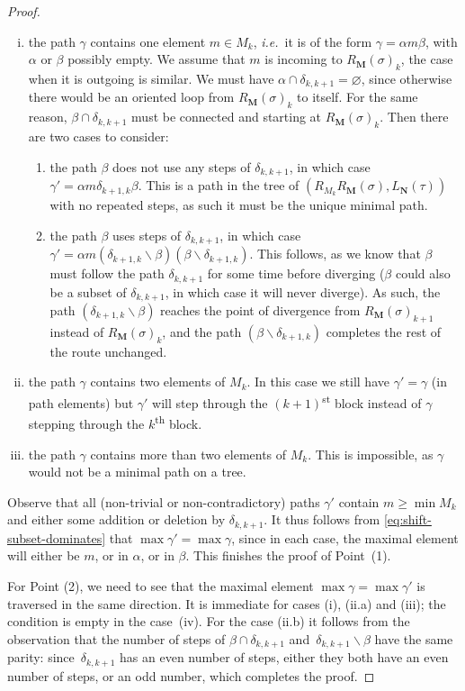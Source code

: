 \documentclass{amsart}
\theoremstyle{definition}
\newcommand{\ssm}{\smallsetminus} %
\newcommand{\ie}{\textit{i.e.}~} %
\newcommand{\ordinal}{\textsuperscript{th}} %
\newcommand{\ordinalst}{\textsuperscript{st}} %
\begin{document}
\begin{proof}
\begin{enumerate}[i)]
\item the path $\gamma$ contains one element $m\in M_k$, \ie it is of the form $\gamma = \alpha m \beta$, with $\alpha$ or $\beta$ possibly empty.
We assume that $m$ is incoming to $R_\mathbf{M}(\sigma)_{k}$, the case when it is outgoing is similar.
We must have $\alpha \cap \delta_{k,k+1}=\varnothing$, since otherwise there would be an oriented loop from $R_\mathbf{M}(\sigma)_{k}$ to itself.
For the same reason, $\beta \cap \delta_{k,k+1}$ must be connected and starting at $R_\mathbf{M}(\sigma)_{k}$.
Then there are two cases to consider:
	\begin{enumerate}
	\item the path $\beta$ does not use any steps of $\delta_{k,k+1}$, in which case $\gamma' = \alpha m \delta_{k+1,k} \beta$.
	This is a path in the tree of $(R_{M_k}R_{\mathbf{M}}(\sigma),L_{\mathbf{N}}(\tau))$ with no repeated steps, as such it must be the unique minimal path. 

	\item the path $\beta$ uses steps of $\delta_{k,k+1}$, in which case $\gamma' = \alpha m (\delta_{k+1,k}\ssm \beta)(\beta \ssm \delta_{k+1,k})$.
	This follows, as we know that $\beta$ must follow the path $\delta_{k,k+1}$ for some time before diverging ($\beta$ could also be a subset of $\delta_{k,k+1}$, in which case it will never diverge).
	As such, the path $(\delta_{k+1,k}\ssm \beta)$ reaches the point of divergence from $R_{\mathbf{M}}(\sigma)_{k+1}$ instead of $R_{\mathbf{M}}(\sigma)_{k}$, and the path $(\beta \ssm \delta_{k+1,k})$ completes the rest of the route unchanged.
	\end{enumerate}

\item the path $\gamma$ contains two elements of $M_k$. 
In this case we still have $\gamma'=\gamma$ (in path elements) but $\gamma'$ will step through the $(k+1)$\ordinalst{} block instead of $\gamma$ stepping through the $k$\ordinal{} block.

\item the path $\gamma$ contains more than two elements of $M_k$. 
This is impossible, as $\gamma$ would not be a minimal path on a tree.

\end{enumerate}
Observe that all (non-trivial or non-contradictory) paths $\gamma'$ contain $m \geq \min M_k$ and either some addition or deletion by $\delta_{k,k+1}$.
It thus follows from \cref{eq:shift-subset-dominates} that $\max \gamma' = \max \gamma$, since in each case, the maximal element will either be $m$, or in $\alpha$, or in $\beta$.
This finishes the proof of Point~(1).

For Point (2), we need to see that the maximal element $\max \gamma = \max \gamma'$ is traversed in the same direction.
It is immediate for cases (i), (ii.a) and (iii); the condition is empty in the case~(iv).
For the case (ii.b) it follows from the observation that the number of steps of $\beta \cap \delta_{k,k+1}$ and~$\delta_{k,k+1} \ssm \beta$ have the same parity: since~$\delta_{k,k+1}$ has an even number of steps, either they both have an even number of steps, or an odd number, which completes the proof.
\end{proof}
\end{document}
